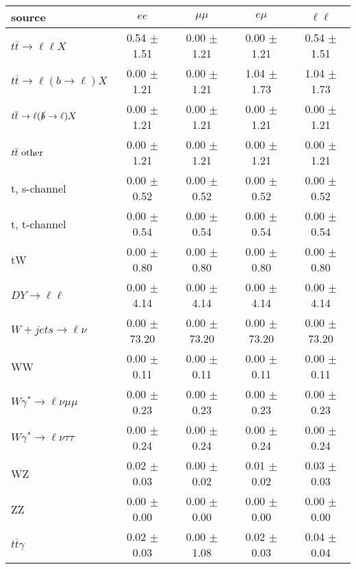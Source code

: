 \begin{tabular}{l|cccc} \hline\hline
source & $ee$ & $\mu\mu$ & $e\mu$ & $\ell\ell $ \\
\hline
$t\overline{t} \rightarrow \ell \ell X$ &  0.54 $\pm$  1.51 &  0.00 $\pm$  1.21 &  0.00 $\pm$  1.21 &  0.54 $\pm$  1.51 \\
$t\overline{t} \rightarrow \ell (b \rightarrow \ell) X$ &  0.00 $\pm$  1.21 &  0.00 $\pm$  1.21 &  1.04 $\pm$  1.73 &  1.04 $\pm$  1.73 \\
$t\overline{t} \rightarrow \ell (\slashed b \rightarrow \ell) X$ &  0.00 $\pm$  1.21 &  0.00 $\pm$  1.21 &  0.00 $\pm$  1.21 &  0.00 $\pm$  1.21 \\
        $t\overline{t}\ \rm{other}$ &  0.00 $\pm$  1.21 &  0.00 $\pm$  1.21 &  0.00 $\pm$  1.21 &  0.00 $\pm$  1.21 \\
\hline
                       t, s-channel &  0.00 $\pm$  0.52 &  0.00 $\pm$  0.52 &  0.00 $\pm$  0.52 &  0.00 $\pm$  0.52 \\
                       t, t-channel &  0.00 $\pm$  0.54 &  0.00 $\pm$  0.54 &  0.00 $\pm$  0.54 &  0.00 $\pm$  0.54 \\
                                 tW &  0.00 $\pm$  0.80 &  0.00 $\pm$  0.80 &  0.00 $\pm$  0.80 &  0.00 $\pm$  0.80 \\
\hline
         $DY \rightarrow \ell \ell$ &  0.00 $\pm$  4.14 &  0.00 $\pm$  4.14 &  0.00 $\pm$  4.14 &  0.00 $\pm$  4.14 \\
      $W+jets \rightarrow \ell \nu$ &  0.00 $\pm$ 73.20 &  0.00 $\pm$ 73.20 &  0.00 $\pm$ 73.20 &  0.00 $\pm$ 73.20 \\
                                 WW &  0.00 $\pm$  0.11 &  0.00 $\pm$  0.11 &  0.00 $\pm$  0.11 &  0.00 $\pm$  0.11 \\
\hline
$W\gamma^{*} \rightarrow \ell \nu \mu\mu$ &  0.00 $\pm$  0.23 &  0.00 $\pm$  0.23 &  0.00 $\pm$  0.23 &  0.00 $\pm$  0.23 \\
$W\gamma^{*} \rightarrow \ell \nu \tau\tau$ &  0.00 $\pm$  0.24 &  0.00 $\pm$  0.24 &  0.00 $\pm$  0.24 &  0.00 $\pm$  0.24 \\
                                 WZ &  0.02 $\pm$  0.03 &  0.00 $\pm$  0.02 &  0.01 $\pm$  0.02 &  0.03 $\pm$  0.03 \\
                                 ZZ &  0.00 $\pm$  0.00 &  0.00 $\pm$  0.00 &  0.00 $\pm$  0.00 &  0.00 $\pm$  0.00 \\
\hline
              $t\overline{t}\gamma$ &  0.02 $\pm$  0.03 &  0.00 $\pm$  1.08 &  0.02 $\pm$  0.03 &  0.04 $\pm$  0.04 \\

\end{tabular}
